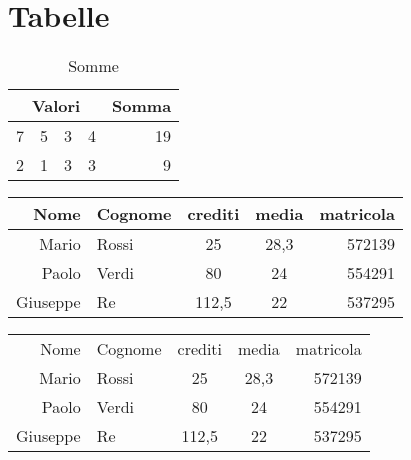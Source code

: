 \documentclass{article}
\begin{document}
\section*{Tabelle}

\begin{table}[h!]
   \centering
   \begin{tabular}{| c c c c | r |}
      \cline{1-4}
      \multicolumn{4}{|c|}{Valori} & \multicolumn{1}{l}{Somma} \\
      \hline
      7 & 5 & 3 & 4 & 19 \\
      2 & 1 & 3 & 3 &  9 \\
      \hline
   \end{tabular}
   \caption{Somme}
   \label{tab:somme}
\end{table}

\vspace{20pt}

\begin{table}[h!]
   \centering
	\begin{tabular}{| r | l || c c | r |}
	   \hline
	   Nome & Cognome & crediti & media & matricola \\
	   \hline
	   Mario & Rossi & 25 & 28,3 & 572139 \\
	   \hline
	   Paolo & Verdi & 80 & 24 & 554291 \\
	   \hline
	   Giuseppe & Re & 112,5 & 22 & 537295 \\
	   \hline
	\end{tabular}
\end{table}

\vspace{20pt}

\begin{table}[h!]
   \centering
	\begin{tabular}{rl|cc|r} 
	    \toprule
	        Nome & Cognome & crediti & media & matricola \\
	    \cmidrule(r){1-2}
	    \cmidrule(rl){3-4}
	    \cmidrule(l){5-5}
	        Mario & Rossi & 25 & 28,3 & 572139 \\
	        Paolo & Verdi & 80 & 24 & 554291 \\
	        Giuseppe & Re & 112,5 & 22 & 537295 \\
	    \bottomrule
	\end{tabular}
\end{table}
\end{document}
